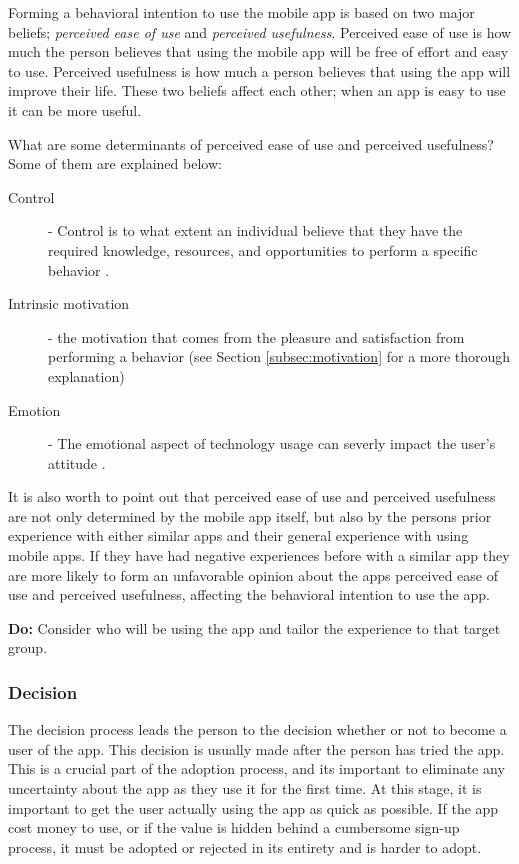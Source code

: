 Forming a behavioral intention to use the mobile app is based on two major beliefs; \textit{perceived ease of use} and \textit{perceived usefulness}. Perceived ease of use is how much the person believes that using the mobile app will be free of effort and easy to use. Perceived usefulness is how much a person believes that using the app will improve their life. These two beliefs affect each other; when an app is easy to use it can be more useful.

What are some determinants of perceived ease of use and perceived usefulness? Some of them are explained below:
\begin{description}
  \item[Control] - Control is to what extent an individual believe that they have the required knowledge, resources, and opportunities to perform a specific behavior \cite{Venkatesh2000}.
  \item[Intrinsic motivation] - the motivation that comes from the pleasure and satisfaction from performing a behavior (see Section \ref{subsec:motivation} for a more thorough explanation)
  \item[Emotion] - The emotional aspect of technology usage can severly impact the user's attitude \cite{Venkatesh2000}.
\end{description}

It is also worth to point out that perceived ease of use and perceived usefulness are not only determined by the mobile app itself, but also by the persons prior experience with either similar apps and their general experience with using mobile apps. If they have had negative experiences before with a similar app they are more likely to form an unfavorable opinion about the apps perceived ease of use and perceived usefulness, affecting the behavioral intention to use the app.

\begin{displayquote}
  \textbf{Do:} Consider who will be using the app and tailor the experience to that target group.
\end{displayquote}

\subsubsection{Decision}
The decision process leads the person to the decision whether or not to become a user of the app. This decision is usually made after the person has tried the app. This is a crucial part of the adoption process, and its important to eliminate any uncertainty about the app as they use it for the first time. At this stage, it is important to get the user actually using the app as quick as possible. If the app cost money to use, or if the value is hidden behind a cumbersome sign-up process, it must be adopted or rejected in its entirety and is harder to adopt.

